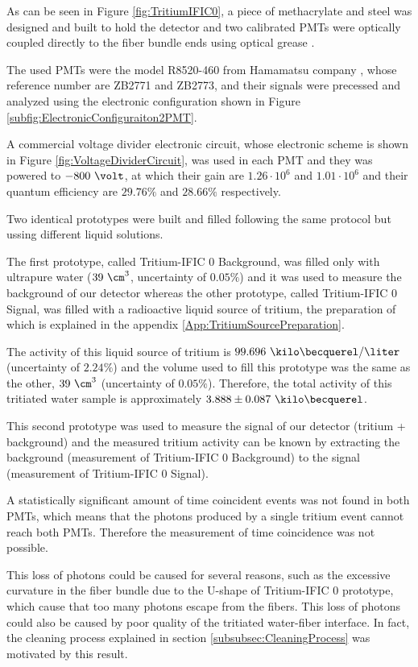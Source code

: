 As can be seen in Figure \ref{fig:TritiumIFIC0}, a piece of methacrylate and steel was designed and built to hold the detector and two calibrated PMTs were optically coupled directly to the fiber bundle ends using optical grease \cite{OpticalGrease}.

The used PMTs were the model R8520-460 from Hamamatsu company \cite{DataSheetPMTs}, whose reference number are ZB2771 and ZB2773, and their signals were precessed and analyzed using the electronic configuration shown in Figure \ref{subfig:ElectronicConfiguraiton2PMT}.

A commercial voltage divider electronic circuit, whose electronic scheme is shown in Figure \ref{fig:VoltageDividerCircuit}, was used in each PMT and they was powered to $-800~\volt$, at which their gain are $1.26 \cdot{} 10^6$ and $1.01 \cdot{} 10^6$ and their quantum efficiency are $29.76\%$ and $28.66\%$ respectively.

Two identical prototypes were built and filled following the same protocol but ussing different liquid solutions. 

The first prototype, called Tritium-IFIC 0 Background, was filled only with  ultrapure water ($39~\cm^3$, uncertainty of $0.05\%$) and it was used to measure the background of our detector whereas the other prototype, called Tritium-IFIC 0 Signal, was filled with a radioactive liquid source of tritium, the preparation of which is explained in the appendix \ref{App:TritiumSourcePreparation}.

The activity of this liquid source of tritium is $99.696~\kilo\becquerel/\liter$ (uncertainty of $2.24\%$) and the volume used to fill this prototype was the same as the other, $39~\cm^3$ (uncertainty of $0.05\%$). Therefore, the total activity of this tritiated water sample is approximately $3.888 \pm 0.087~\kilo\becquerel$. 

This second prototype was used to measure the signal of our detector (tritium + background) and the measured tritium activity can be known by extracting the background (measurement of Tritium-IFIC 0 Background) to the signal (measurement of Tritium-IFIC 0 Signal).

A statistically significant amount of time coincident events was not found in both PMTs, which means that the photons produced by a single tritium event cannot reach both PMTs. Therefore the measurement of time coincidence was not possible. 

This loss of photons could be caused for several reasons, such as the excessive curvature in the fiber bundle due to the U-shape of Tritium-IFIC 0 prototype, which cause that too many photons escape from the fibers. This loss of photons could also be caused by poor quality of the tritiated water-fiber interface. In fact, the cleaning process explained in section \ref{subsubsec:CleaningProcess} was motivated by this result.


